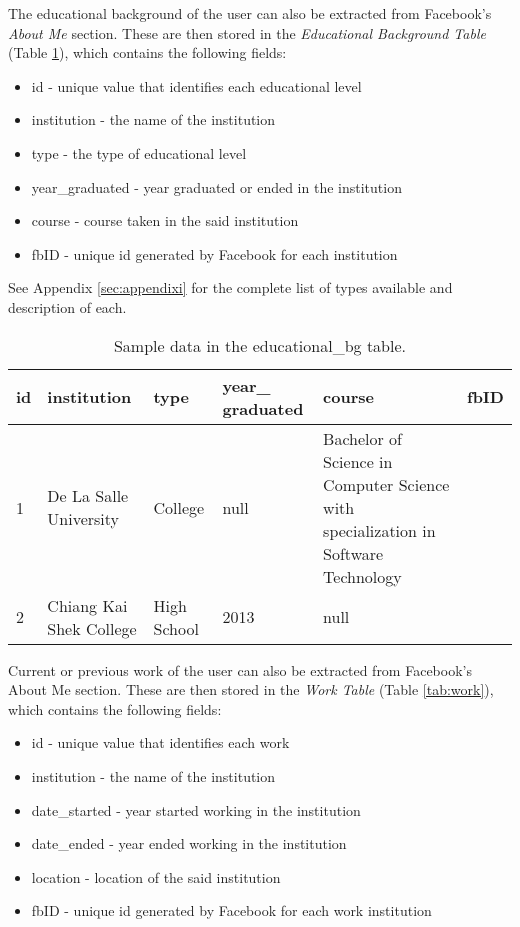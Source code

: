 The educational background of the user can also be extracted from Facebook's \textit{About Me} section. These are then stored in the \textit{Educational Background Table} (Table \ref{tab:EducationalBG}), which contains the following fields:
\begin{itemize}
	\item id - unique value that identifies each educational level
	\item institution - the name of the institution
	\item type - the type of educational level
	\item year\_graduated - year graduated or ended in the institution
	\item course - course taken in the said institution
	\item fbID - unique id generated by Facebook for each institution
\end{itemize}
See Appendix \ref{sec:appendixi} for the complete list of types available and description of each.

\begin{table}[ph!]   %
	\centering
	\caption{Sample data in the educational_bg table.} \vspace{0.25em}
	\begin{tabular}{|p{.5cm}|p{1in}|p{1.5cm}|p{2cm}|p{2.5cm}|p{2cm}|} \hline
		\textbf{id} & \textbf{institution} & \textbf{type} & \textbf{year\_ \newline graduated} & \textbf{course} & \textbf{fbID} \\ \hline
		1 & De La Salle University & College & null & Bachelor of Science in Computer Science with specialization in Software Technology &  \\ \hline
		2 & Chiang Kai Shek College & High School & 2013 & null & \\ \hline
	\end{tabular}
	\label{tab:EducationalBG}
\end{table}

Current or previous work of the user can also be extracted from Facebook's About Me section. These are then stored in the \textit{Work Table} (Table \ref{tab:work}), which contains the following fields:
\begin{itemize}
	\item id - unique value that identifies each work
	\item institution - the name of the institution
	\item date\_started - year started working in the institution
	\item date\_ended - year ended working in the institution
	\item location - location of the said institution
	\item fbID - unique id generated by Facebook for each work institution
\end{itemize}

